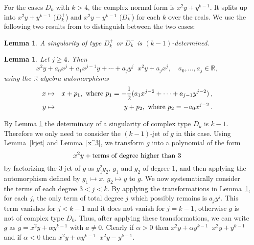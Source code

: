 \documentclass[noend]{amsproc}
\newtheorem{lemma}[theorem]{Lemma}
\DeclareMathOperator{\requiv}{\overset{r}{\sim}}
\begin{document}
For the cases $D_k$ with $k > 4$, the complex normal form is $x^2y+y^{k-1}$. It
splits up into $x^2y+y^{k-1}$ ($D_k^+$) and $x^2y-y^{k-1}$ ($D_k^-$) for each
$k$ over the reals. We use the following two results from \cite{Siersma} to
distinguish between the two cases:

\begin{lemma}\label{kDeterminacyD[k]k>4}
A singularity of type $D_k^+$ or $D_k^-$ is $(k-1)$-determined.
\end{lemma}

\begin{lemma}\label{transformationD[k]}
Let $j\ge 4$. Then
\[
x^2y+a_0x^j+a_1x^{j-1}y+\cdots+a_jy^j\requiv x^2y+a_jx^j,
\quad a_0,\ldots,a_j\in\mathbb R,
\]
using the $\mathbb R$-algebra automorphisms
\begin{eqnarray*}
x&\mapsto&x+p_1,\textnormal{ where }
p_1=-\frac{1}{2}(a_1x^{j-2}+\cdots+a_{j-1}y^{j-2})\,,\\
y&\mapsto&y+p_2,\textnormal{ where } p_2=-a_0x^{j-2} \,.
\end{eqnarray*}
\end{lemma}

By Lemma \ref{kDeterminacyD[k]k>4} the determinacy of a singularity of  complex
type
$D_k$ is $k-1$. Therefore we only need to consider the
$(k-1)$-jet of $g$ in this case. Using Lemma~\ref{kjet} and Lemma~\ref{x^3}, we
transform $g$ into a polynomial of the form
\[x^2y+\textnormal{terms of degree higher than $3$}\]
by factorizing the $3$-jet of $g$ as $g_1^2g_2$, $g_1$ and $g_2$ of
degree $1$,
and then applying the automorphism defined by $g_1\mapsto x$, $g_2\mapsto y$ to
$g$. We
now systematically consider the terms of each degree $3<j<k$. By applying the
transformations in Lemma~\ref{transformationD[k]}, for each $j$, the only term
of total degree $j$ which possibly remains is $a_jy^j$. This term vanishes for
$j<k-1$ and it does not vanish for $j=k-1$, otherwise $g$ is not of complex
type $D_k$. Thus, after applying these transformations,
we can write $g$ as $g=x^2y+\alpha y^{k-1}$ with $a\neq0$. Clearly if
$\alpha>0$ then $x^2y+\alpha y^{k-1}\requiv x^2y+y^{k-1}$ and if $\alpha<0$
then $x^2y+\alpha y^{k-1}\requiv x^2y-y^{k-1}$.
\end{document}
